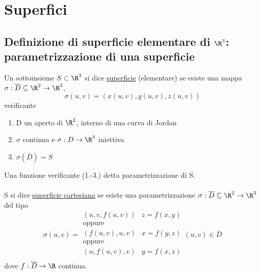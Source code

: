 \section{Superfici}
\subsection{Definizione di superficie elementare di $\R^3$: parametrizzazione di una superficie}
\begin{definition}
  Un sottoinsieme $S\subset\R^3$ si dice \underline{superficie} (elementare) se esiste una mappa
  $\sigma:\overline{D}\subseteq\R^2\to\R^3$, 
  $$\sigma(u,v) = (x(u,v),y(u,v),z(u,v))$$
  verificante
  \begin{enumerate}
    \item D \ace un aperto di $\R^2$, interno di una curva di Jordan
    \item $\sigma$ \ace continua e $\sigma:D\to\R^3$ \ace iniettiva
    \item $\sigma(\overline{D})=S$
  \end{enumerate}
  Una funzione verificante (1.-3.) \ace detta parametrizzazione di S. \\\\
  S si dice \underline{superficie cartesiana} se esiste una parametrizzazione
  $\sigma : \overline{D}\subseteq\R^2\to\R^3$ del tipo
  $$\sigma(u,v) = \begin{array}{lr}
    (u,v,f(u,v)) & z = f(x,y) \\
    \text{oppure} \\
    (f(u,v),u,v) & x = f(y,z) \\
    \text{oppure} \\
    (u,f(u,v),v) & y = f(x,z) \\
  \end{array} (u,v)\in\overline{D}$$
  dove $f:\overline{D}\to\R$ continua.
\end{definition}